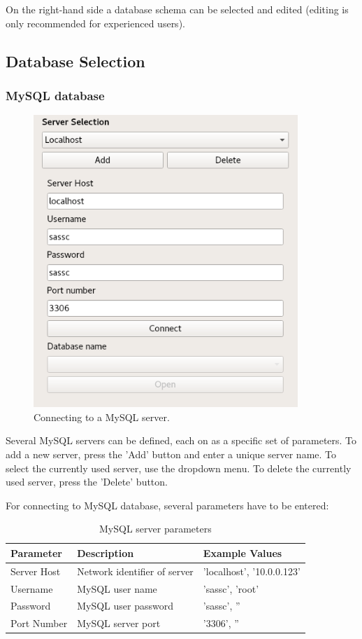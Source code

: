 \documentclass[10pt,letterpaper,extrafontsizes]{memoir}
\begin{document}
On the right-hand side a database schema can be selected and edited (editing is only recommended for experienced users).

\subsection{Database Selection}
\subsubsection{MySQL database}

\begin{figure}[H]
  \center
    \includegraphics[width=10cm]{../screenshots/mysql_server_selection.png}
  \caption{Connecting to a MySQL server.}
  \label{fig:mysql_connect}
\end{figure}

Several MySQL servers can be defined, each on as a specific set of parameters. To add a new server, press the 'Add' button and enter a unique server name. To select the currently used server, use the dropdown menu. To delete the currently used server, press the 'Delete' button.

For connecting to MySQL database, several parameters have to be entered:

\begin{table}[h]
  \center
  \begin{tabular}{ | l | l | l |}
    \hline
    \textbf{Parameter} & \textbf{Description} & \textbf{Example Values} \\ \hline
    Server Host & Network identifier of server & 'localhost', '10.0.0.123' \\ \hline
    Username & MySQL user name & 'sassc', 'root' \\ \hline
    Password & MySQL user password & 'sassc', '' \\ \hline
    Port Number & MySQL server port & '3306', '' \\
    \hline
  \end{tabular}
  \caption{MySQL server parameters}
\end{table}
\end{document}
